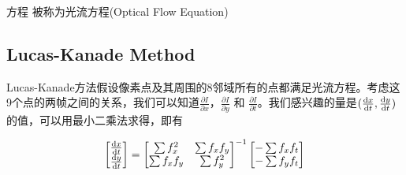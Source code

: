 方程  被称为光流方程(Optical Flow Equation)


\subsection{Lucas-Kanade Method}

Lucas-Kanade方法假设像素点及其周围的8邻域所有的点都满足光流方程。考虑这9个点的两帧之间的关系，我们可以知道$\frac{\partial I}{\partial x}$，$\frac{\partial I}{\partial y}$ 和 $\frac{\partial I}{\partial t}$。我们感兴趣的量是$(\frac{\mathrm{d} x}{\mathrm{d} t}, \frac{\mathrm{d} y}{\mathrm{d} t})$的值，可以用最小二乘法求得，即有

\begin{equation}
    \begin{bmatrix}
        \frac{\mathrm{d} x}{\mathrm{d} t} \\
        \frac{\mathrm{d} y}{\mathrm{d} t}
    \end{bmatrix} = \begin{bmatrix}
        \sum f_x^2   & \sum f_x f_y \\
        \sum f_x f_y & \sum f_y^2   \\
    \end{bmatrix}^{-1} \begin{bmatrix}
        -\sum f_x f_t \\
        -\sum f_y f_t \\
    \end{bmatrix}
\end{equation}